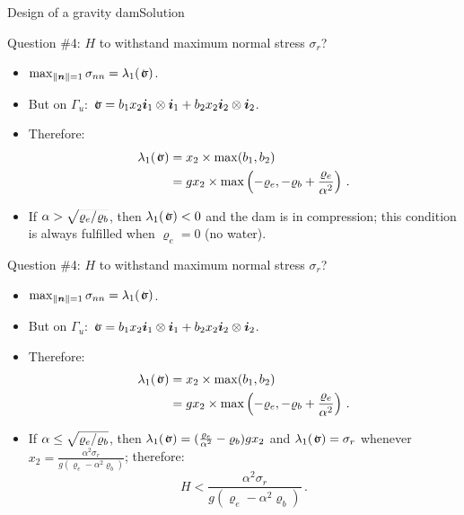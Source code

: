 \documentclass{beamer}
\newcommand{\xj}{x}
\renewcommand{\ij}{i}
\newcommand{\iv}{{\boldsymbol\ij}}
\newcommand{\nj}{n}
\newcommand{\nv}{{\boldsymbol\nj}}
\newcommand{\roi}{\varrho}
\newcommand*{\stressj}{\sigma}
\newcommand{\stress}{\mbox{$\hspace{0.3em}\rotatebox[x=0pt,y=0.2pt]{90}{\rule{0.017\linewidth}{0.4pt}}\hspace{-0.25em}\upsigma$}}
\newcommand{\norm}[1]{\left\|#1\right\|}
\begin{document}
\begin{frame}{Design of a gravity dam}{Solution}
\begin{overprint}
\vskip-20pt
\begin{exampleblock}{Question \#4: $H$ to withstand maximum normal stress $\stressj_r$?}
\begin{itemize}
\item $\max_{\norm{\nv}=1}\stressj_{\nj\nj}=\lambda_1(\stress)$.
\item But on $\Gamma_u$: $\stress=b_1\xj_2\iv_1\otimes\iv_1 + b_2\xj_2\iv_2\otimes\iv_2$.
\item Therefore:
\begin{displaymath}
\begin{split}
\lambda_1(\stress) &=\xj_2\times\max(b_1,b_2) \\
&=g\xj_2\times\max\left(-\roi_e, -\roi_b+\frac{\roi_e}{\alpha^2}\right)\,.
\end{split}
\end{displaymath}
\item If $\alpha>\smash{\sqrt{\roi_e/\roi_b}}$, then $\lambda_1(\stress)<0$ and the dam is in compression; this condition is always fulfilled when $\roi_e=0$ (no water).
\end{itemize}
\end{exampleblock}

\vskip-20pt
\begin{exampleblock}{Question \#4: $H$ to withstand maximum normal stress $\stressj_r$?}
\begin{itemize}
\item $\max_{\norm{\nv}=1}\stressj_{\nj\nj}=\lambda_1(\stress)$.
\item But on $\Gamma_u$: $\stress=b_1\xj_2\iv_1\otimes\iv_1 + b_2\xj_2\iv_2\otimes\iv_2$.
\item Therefore:
\begin{displaymath}
\begin{split}
\lambda_1(\stress) &=\xj_2\times\max(b_1,b_2) \\
&=g\xj_2\times\max\left(-\roi_e, -\roi_b+\frac{\roi_e}{\alpha^2}\right)\,.
\end{split}
\end{displaymath}
\item If $\alpha\leq\smash{\sqrt{\roi_e/\roi_b}}$, then $\lambda_1(\stress)=(\frac{\roi_e}{\alpha^2}-\roi_b)g\xj_2$ and $\lambda_1(\stress)=\stressj_r$ whenever $\xj_2=\frac{\alpha^2\stressj_r}{g(\roi_e-\alpha^2\roi_b)}$; therefore:
\begin{displaymath}
H<\frac{\alpha^2\stressj_r}{g(\roi_e-\alpha^2\roi_b)}\,.
\end{displaymath}
\end{itemize}
\end{exampleblock}

\end{overprint}

\end{frame}
\end{document}
